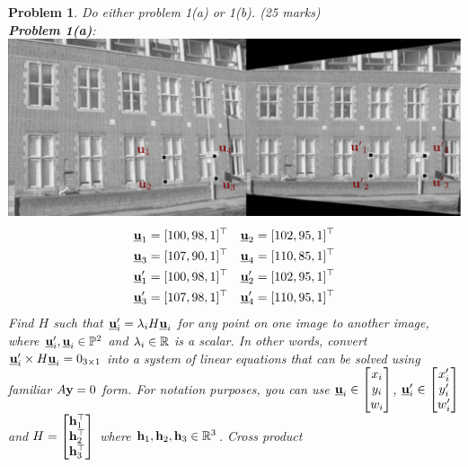 \documentclass{article}
\newtheorem{prob}{Problem}
\begin{document}
\newcommand{\ubfu}{\underline{\bfu}}
\newcommand{\ubfX}{\underline{\bfX}}
\newpage
\begin{prob}
  Do either problem 1(a) or 1(b). (25 marks)
  \\
  \textbf{Problem 1(a)}:\\
  \includegraphics[width=\linewidth]{media/removing-perspective-distortion.png.pdf}
  \begin{align*}
    \ubfu_1 &= [100, 98, 1]^\top&
                                  \ubfu_2 &= [102, 95, 1]^\top\\
    \ubfu_3 &= [107, 90, 1]^\top&
                                  \ubfu_4 &= [110, 85, 1]^\top \\
    \ubfu'_1 &= [100, 98, 1]^\top&
                                   \ubfu'_2 &= [102, 95, 1]^\top\\
    \ubfu'_3 &= [107, 98, 1]^\top&
                                   \ubfu'_4 &= [110, 95, 1]^\top
  \end{align*}
  Find $H$ such that $\ubfu'_i = \lambda_i H\ubfu_i$ for any point on one image to another
  image, where $\ubfu'_i, \ubfu_i \in \bbP^2$ and $\lambda_i \in \mathbb{R}$ is a scalar. In other words, convert $\ubfu'_i
  \times H \ubfu_i = 0_{3 \times 1}$ into a system of linear equations that can
  be solved using familiar $A\mathbf{y} = 0$ form. For notation purposes, you can use
  $\ubfu_i \in \begin{bmatrix}x_i\\ y_i \\ w_i\end{bmatrix}$,
  $\ubfu'_i \in \begin{bmatrix}x'_i\\ y'_i \\ w'_i\end{bmatrix}$ and $H
  = \begin{bmatrix}
    \mathbf{h}_1^\top \\
    \mathbf{h}_2^\top \\
    \mathbf{h}_3^\top
    \end{bmatrix}$ where $\mathbf{h}_1, \mathbf{h}_2, \mathbf{h}_3 \in \mathbb{R}^3$. Cross product

\end{prob}
\end{document}
